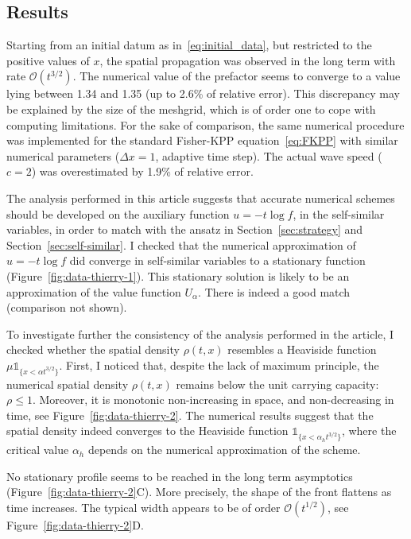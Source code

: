 \documentclass[AHL,Unicode,longabstracts]{cedram}
\newcommand{\mO}{\mathcal{O}}
\newcommand{\1}{\mathds{1}}
\begin{document}
\subsection{Results}
Starting from an initial datum as in~\eqref{eq:initial_data}, but restricted to the positive values of $x$, the spatial propagation was observed in the long term with rate $\mO(t^{3/2})$. The numerical value of the prefactor seems to converge to a value lying between 1.34 and 1.35 (up to 2.6\% of relative error).
This discrepancy may be explained by the size of the meshgrid, which is of order one to cope with computing limitations.
For the sake of comparison, the same numerical procedure was implemented for the standard Fisher-KPP equation~\eqref{eq:FKPP} with similar numerical parameters ($\Delta x = 1$, adaptive time step). The actual wave speed ($c=2$) was overestimated by 1.9\% of relative error.

The analysis performed in this article suggests that accurate numerical schemes should be developed on the auxiliary function $u = -t\log f$, in the self-similar variables, in order to match with the ansatz in Section~\ref{sec:strategy} and Section~\ref{sec:self-similar}. I checked that the numerical approximation of $u = -t\log f$ did converge in self-similar variables to a stationary function (Figure~\ref{fig:data-thierry-1}). This stationary solution is likely to be an approximation of the value function $U_{\alpha}$. There is indeed a good match (comparison not shown).

To investigate further the consistency of the analysis performed in the article, I checked whether the spatial density $\rho(t,x)$ resembles a Heaviside function $\mu \1_{\{x < \alpha t^{3/2}\}}$. First, I noticed that, despite the lack of maximum principle, the numerical spatial density $\rho(t,x)$ remains below the unit carrying capacity: $\rho\leq 1$. Moreover, it is monotonic non-increasing in space, and non-decreasing in time, see Figure~\ref{fig:data-thierry-2}. The numerical results suggest that the spatial density indeed converges to the Heaviside function $\1_{\{ x < \alpha_h t^{3/2}\}}$, where the critical value $\alpha_h$ depends on the numerical approximation of the scheme.

No stationary profile seems to be reached in the long term asymptotics (Figure~\ref{fig:data-thierry-2}C). More precisely, the shape of the front flattens as time increases. The typical width appears to be of order $\mO(t^{1/2})$, see Figure~\ref{fig:data-thierry-2}D.

\vspace{20pt}


\end{document}
